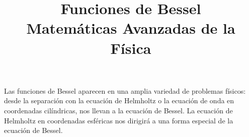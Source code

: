 
\usepackage{mathrsfs}
\usepackage{standalone}
\usepackage{tikz}
\usetikzlibrary{shapes}
\usepackage{bigints}
\title{Funciones de Bessel \\ {\large Matemáticas Avanzadas de la Física}}
\date{ }

\renewcommand\labelenumii{\theenumi.{\arabic{enumii}}}
\maketitle
\fontsize{14}{14}\selectfont
Las funciones de Bessel aparecen en una amplia variedad de problemas físicos: desde la separación con la ecuación de Helmholtz o la ecuación de onda en coordenadas cilíndricas, nos llevan a la ecuación de Bessel. La ecuación de Helmholtz en coordenadas esféricas nos dirigirá a una forma especial de la ecuación de Bessel.
